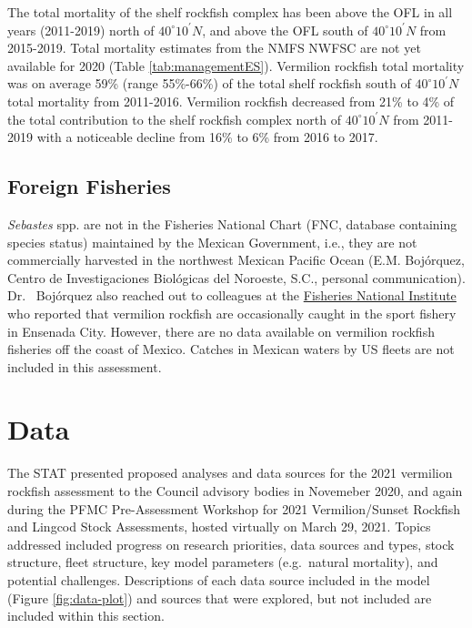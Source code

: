 \documentclass[11pt,
  english,
]{article}
\begin{document}
The total mortality of the shelf rockfish complex has been above the OFL in all years (2011-2019) north of $40^\circ 10^\prime N$, and above the OFL south of $40^\circ 10^\prime N$ from 2015-2019. Total mortality estimates from the NMFS NWFSC are not yet available for 2020 (Table \ref{tab:managementES}). Vermilion rockfish total mortality was on average 59\% (range 55\%-66\%) of the total shelf rockfish south of $40^\circ 10^\prime N$ total mortality from 2011-2016. Vermilion rockfish decreased from 21\% to 4\% of the total contribution to the shelf rockfish complex north of $40^\circ 10^\prime N$ from 2011-2019 with a noticeable decline from 16\% to 6\% from 2016 to 2017.


\hypertarget{foreign-fisheries}{%
\subsection{Foreign Fisheries}\label{foreign-fisheries}}

\leavevmode\tagmcend\tagstructend

\emph{Sebastes} spp. are not in the Fisheries National Chart (FNC, database containing species status) maintained by the Mexican Government, i.e., they are not commercially harvested in the northwest Mexican Pacific Ocean (E.M. Bojórquez, Centro de Investigaciones Biológicas del Noroeste, S.C., personal communication). Dr.~ Bojórquez also reached out to colleagues at the {\href{https://www.gob.mx/inapesca}{Fisheries National Institute}\leavevmode\tagmcend\tagstructend} who reported that vermilion rockfish are occasionally caught in the sport fishery in Ensenada City. However, there are no data available on vermilion rockfish fisheries off the coast of Mexico. Catches in Mexican waters by US fleets are not included in this assessment.

\FloatBarrier


\hypertarget{data}{%
\section{Data}\label{data}}

\leavevmode\tagmcend\tagstructend

The STAT presented proposed analyses and data sources for the 2021 vermilion rockfish assessment to the Council advisory bodies in Novemeber 2020, and again during the PFMC Pre-Assessment Workshop for 2021 Vermilion/Sunset Rockfish and Lingcod Stock Assessments, hosted virtually on March 29, 2021. Topics addressed included progress on research priorities, data sources and types, stock structure, fleet structure, key model parameters (e.g.~natural mortality), and potential challenges. Descriptions of each data source included in the model (Figure \ref{fig:data-plot}) and sources that were explored, but not included are included within this section.
\end{document}
